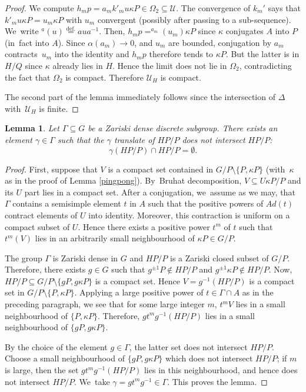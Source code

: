 \documentclass[JEP,XML,SOM,Unicode,published]{cedram}
\newtheorem{lemma}{Lemma}
\theoremstyle{definition}
\begin{document}
\begin{proof}
We compute $h_mp=a_mk'_mu\kappa P \in \Omega_2 \subseteq{\mathcal U}$.
The convergence of $k_m'$ says that $k'_mu\kappa P=u_m\kappa P$ with
$u_m$ convergent (possibly after passing to a sub-sequence). We~write
$^a(u)\overset{\text{def.}}{=}aua^{-1}$. Then, $h_mp=^{a_m}(u_m)\kappa P$
since $\kappa $ conjugates $A$ into $P$ (in~fact into $A$). Since
$\alpha (a_m)\to 0$, and $u_m$ are bounded, conjugation by $a_m$
contracts~$u_m$ into the identity and $h_mp$ therefore tends to
$\kappa P$. But the latter is in $H/Q$ since $\kappa $ already lies
in $H$. Hence the limit does not lie in $\Omega_2$, contradicting
the fact that $\Omega_2$ is compact. Therefore ${\mathcal U}_H$ is
compact.

The second part of the lemma immediately follows since the
intersection of $\Delta $ with~${\mathcal U}_H$ is finite.
\end{proof}

\begin{lemma} \label{goodset} Let $\Gamma \subseteq G$ be a Zariski dense
discrete subgroup. There exists an element $\gamma \in \Gamma $ such
that the $\gamma $ translate of $HP/P$ does not intersect $HP/P$:
\[
\gamma (HP/P) \cap HP/P=\emptyset.
\]
\end{lemma}

\begin{proof} First, suppose that $V$ is a compact set contained in
$G/P\setminus \{P,\kappa P \}$ (with~$\kappa $ as in the proof of
Lemma \ref{pingpong}). By~Bruhat decomposition, $V\subseteq U\kappa P/P$
and its $U$ part lies in a compact set. After a conjugation, we~assume
as we may, that $\Gamma $ contains a semisimple element $t$ in $A$ such that
the positive powers of $Ad (t)$ contract elements of $U$ into identity.
Moreover, this contraction is uniform on a compact subset of $U$. Hence
there exists a positive power $t^m$ of $t$ such that
$t^m (V)$ lies in an arbitrarily small neighbourhood of $\kappa P \in G/P$.

The group $\Gamma $ is Zariski dense in $G$ and $HP/P$ is a Zariski closed subset
of $G/P$. Therefore, there exists $g\in G$ such that $g^{\pm 1}P \notin HP/P$ and
$g^{\pm 1}\kappa P\notin HP/P$. Now, $HP/P\subseteq G/P\setminus \{gP, g\kappa P\}$ is a
compact set. Hence $V=g^{-1}(HP/P)$ is a compact set in $G/P\setminus \{P,\kappa P\}$.
Applying a large positive power of $t\in \Gamma \cap A$ as in the preceding paragraph,
we see that for some large integer $m$, $t^m V$ lies in a small neighbourhood of
$\{P,\kappa P\}$. Therefore, $gt^m g^{-1}(HP/P)$ lies in a small neighbourhood of
$\{gP,g\kappa P\}$.

By the choice of the element $g\in \Gamma $, the latter
set does not intersect $HP/P$. Choose a small neighbourhood of
$\{gP, g\kappa P\}$ which does not intersect $HP/P$; if $m$ is large, then
the set $gt^mg^{-1}(HP/P)$ lies in this neighbourhood, and hence does not intersect
$HP/P$. We~take $\gamma =gt^mg^{-1} \in \Gamma$. This proves the lemma.
\end{proof}
\end{document}
